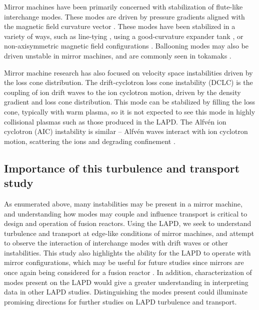 Mirror machines have been primarily concerned with stabilization of flute-like interchange modes. These modes are driven by pressure gradients aligned with the magnetic field curvature vector \cite{Post_1987, ferron_interchange_1983, wickham_curvature-induced_1982}. These modes have been stabilized in a variety of ways, such as line-tying \cite{Fornaca_1979}, using a good-curvature expander tank \cite{Ryutov_2011,Ivanov_2013}, or non-axisymmetric magnetic field configurations \cite{moir_yin-yang_1969}. Ballooning modes \cite{dippolito_low-_1981} may also be driven unstable in mirror machines, and are commonly seen in tokamaks \cite{strait_stability_1994, connor_review_1998}.

Mirror machine research has also focused on velocity space instabilities driven by the loss cone distribution. The drift-cyclotron loss cone instability (DCLC) \cite{baldwin_potential-confined_1979, ferron_dependence_1984, kotelnikov_electrostatic_2017} is the coupling of ion drift waves to the ion cyclotron motion, driven by the density gradient and loss cone distribution. This mode can be stabilized by filling the loss cone, typically with warm plasma, so it is not expected to see this mode in highly collisional plasmas such as those produced in the LAPD. The Alfv\'en ion cyclotron (AIC) instability is similar -- Alfv\'en waves interact with ion cyclotron motion, scattering the ions and degrading confinement \cite{Casper_1982}. 

\subsection{Importance of this turbulence and transport study}

As enumerated above, many instabilities may be present in a mirror machine, and understanding how modes may couple and influence transport is critical to design and operation of fusion reactors. Using the LAPD, we seek to understand turbulence and transport at edge-like conditions of mirror machines, and attempt to observe the interaction of interchange modes with drift waves or other instabilities. This study also highlights the ability for the LAPD to operate with mirror configurations, which may be useful for future studies since mirrors are once again being considered for a fusion reactor \cite{WHAM, BEAM, frank_integrated_2024}. In addition, characterization of modes present on the LAPD would give a greater understanding in interpreting data in other LAPD studies. Distinguishing the modes present could illuminate promising directions for further studies on LAPD turbulence and transport.

